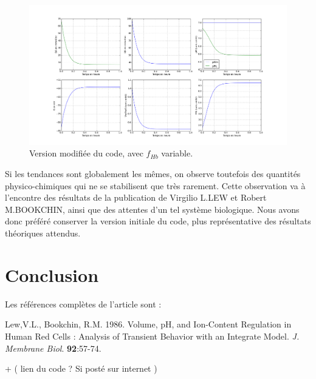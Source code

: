 \documentclass[a4paper,fleqn]{article}
\begin{document}
\begin{figure}[H]
\centering 
\includegraphics[width=1.1\textwidth]{avec_fhb.png}
\caption{Version modifiée du code, avec $f_{Hb}$ variable.}
\end{figure} 

Si les tendances sont globalement les mêmes, on  observe toutefois des quantités physico-chimiques qui ne se stabilisent que très rarement. Cette observation va à l'encontre des résultats de la publication de Virgilio L.LEW et Robert M.BOOKCHIN, ainsi que des attentes d'un tel système biologique. Nous avons donc préféré conserver la version initiale du code, plus représentative des résultats théoriques attendus.


\section{Conclusion} 

Les références complètes de l'article sont :

Lew,V.L., Bookchin, R.M. 1986. Volume, pH, and Ion-Content Regulation in Human Red Cells : Analysis of Transient Behavior with  an Integrate Model. \textit{J. Membrane Biol}. \textbf{92}:57-74.


+ ( lien du code ? Si posté sur internet )
 







\end{document}
